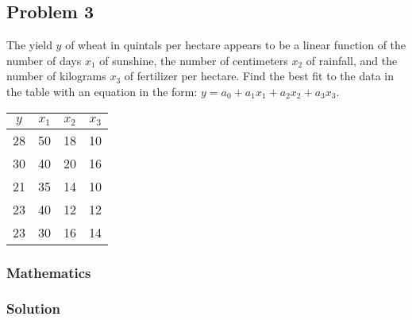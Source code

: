 \subsection{Problem 3}%
\label{sec:problem_3}
The yield $y$ of wheat in quintals per hectare appears to be a linear function of the
number of days $x_1$ of sunshine, the number of centimeters $x_2$ of rainfall, and the
number of kilograms $x_3$ of fertilizer per hectare. Find the best fit to the data in
the table with an equation in the form: $y=a_0+a_1x_1+a_2x_2+a_3x_3$.

\begin{center}
\begin{tabular}{|c|c|c|c|}
  \hline
  $y$ & $x_1$ & $x_2$ & $x_3$ \\
  \hline
  28 & 50 & 18 & 10 \\
  \hline
  30 & 40 & 20 & 16 \\
  \hline
  21 & 35 & 14 & 10 \\
  \hline
  23 & 40 & 12 & 12 \\
  \hline
  23 & 30 & 16 & 14 \\
  \hline
\end{tabular}
\end{center}

\subsubsection*{Mathematics}
\subsubsection*{Solution}
